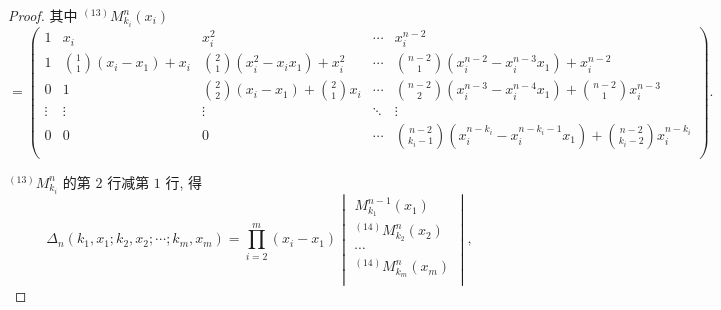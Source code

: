 \documentclass{ctexart}
\begin{document}
\begin{proof}
    其中 $^{(13)}M_{k_i}^n(x_i)$
    \[=\begin{pmatrix}
        1 & x_i & x_i^2 & \cdots & x_i^{n-2} \\[4pt]
        1 & \binom{1}{1}(x_i-x_1)+x_i & \binom{2}{1}(x_i^2-x_ix_1)+x_i^2 & \cdots & \binom{n-2}{1}(x_i^{n-2}-x_i^{n-3}x_1)+x_i^{n-2} \\[10pt]
        0 & 1 & \binom{2}{2}(x_i-x_1)+\binom{2}{1}x_i & \cdots & \binom{n-2}{2}(x_i^{n-3}-x_i^{n-4}x_1)+\binom{n-2}{1}x_i^{n-3} \\
        \vdots & \vdots & \vdots & \ddots & \vdots \\[4pt]
        0 & 0 & 0 & \cdots & \binom{n-2}{k_i-1}(x_i^{n-k_i}-x_i^{n-k_i-1}x_1)+\binom{n-2}{k_i-2}x_i^{n-k_i} \\
    \end{pmatrix}.\]

    $^{(13)}M_{k_i}^n$ 的第 $2$ 行减第 $1$ 行, 得
    \[\Delta_n(k_1,x_1;k_2,x_2;\cdots;k_m,x_m)=\prod\limits_{i=2}^m(x_i-x_1)\begin{vmatrix}
        M_{k_1}^{n-1}(x_1) \\
        ^{(14)}M_{k_2}^n(x_2) \\
        \cdots \\
        ^{(14)}M_{k_m}^n(x_m) \\
    \end{vmatrix},\]


\end{proof}
\end{document}
